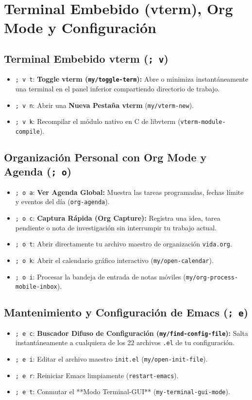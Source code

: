 \documentclass[11pt,book,spanish,alphabetic]{apuntes-scr}
\begin{document}
\chapter{Terminal Embebido (vterm), Org Mode y Configuración}

\section{Terminal Embebido vterm (\texttt{; v})}
\begin{itemize}[leftmargin=8mm]
    \item \texttt{; v t}: \textbf{Toggle vterm (\texttt{my/toggle-term}):} Abre o minimiza instantáneamente una terminal en el panel inferior compartiendo directorio de trabajo.
    \item \texttt{; v n}: Abrir una \textbf{Nueva Pestaña vterm} (\texttt{my/vterm-new}).
    \item \texttt{; v k}: Recompilar el módulo nativo en C de libvterm (\texttt{vterm-module-compile}).
\end{itemize}

\section{Organización Personal con Org Mode y Agenda (\texttt{; o})}
\begin{itemize}[leftmargin=8mm]
    \item \texttt{; o a}: \textbf{Ver Agenda Global:} Muestra las tareas programadas, fechas límite y eventos del día (\texttt{org-agenda}).
    \item \texttt{; o c}: \textbf{Captura Rápida (Org Capture):} Registra una idea, tarea pendiente o nota de investigación sin interrumpir tu trabajo actual.
    \item \texttt{; o t}: Abrir directamente tu archivo maestro de organización \texttt{vida.org}.
    \item \texttt{; o k}: Abrir el calendario gráfico interactivo (\texttt{my/open-calendar}).
    \item \texttt{; o i}: Procesar la bandeja de entrada de notas móviles (\texttt{my/org-process-mobile-inbox}).
\end{itemize}

\section{Mantenimiento y Configuración de Emacs (\texttt{; e})}
\begin{itemize}[leftmargin=8mm]
    \item \texttt{; e c}: \textbf{Buscador Difuso de Configuración (\texttt{my/find-config-file}):} Salta instantáneamente a cualquiera de los 22 archivos \texttt{.el} de tu configuración.
    \item \texttt{; e i}: Editar el archivo maestro \texttt{init.el} (\texttt{my/open-init-file}).
    \item \texttt{; e r}: Reiniciar Emacs limpiamente (\texttt{restart-emacs}).
    \item \texttt{; e t}: Conmutar el **Modo Terminal-GUI** (\texttt{my-terminal-gui-mode}).
\end{itemize}
\end{document}
